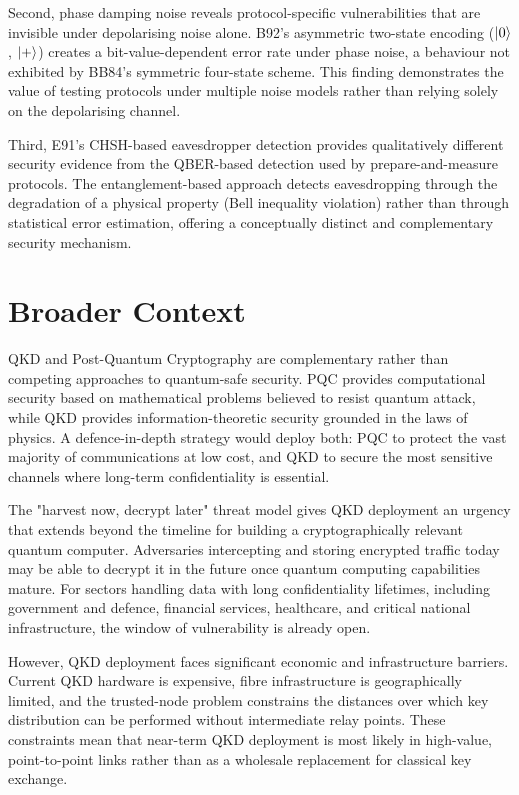 \documentclass[10pt, a4paper]{report}
\begin{document}
Second, phase damping noise reveals protocol-specific vulnerabilities that are invisible under depolarising noise alone. B92's asymmetric two-state encoding ($\ket{0}$, $\ket{+}$) creates a bit-value-dependent error rate under phase noise, a behaviour not exhibited by BB84's symmetric four-state scheme. This finding demonstrates the value of testing protocols under multiple noise models rather than relying solely on the depolarising channel.

Third, E91's CHSH-based eavesdropper detection provides qualitatively different security evidence from the QBER-based detection used by prepare-and-measure protocols. The entanglement-based approach detects eavesdropping through the degradation of a physical property (Bell inequality violation) rather than through statistical error estimation, offering a conceptually distinct and complementary security mechanism.



\section{Broader Context}

QKD and Post-Quantum Cryptography are complementary rather than competing approaches to quantum-safe security. PQC provides computational security based on mathematical problems believed to resist quantum attack, while QKD provides information-theoretic security grounded in the laws of physics. A defence-in-depth strategy would deploy both: PQC to protect the vast majority of communications at low cost, and QKD to secure the most sensitive channels where long-term confidentiality is essential.

The "harvest now, decrypt later" threat model gives QKD deployment an urgency that extends beyond the timeline for building a cryptographically relevant quantum computer. Adversaries intercepting and storing encrypted traffic today may be able to decrypt it in the future once quantum computing capabilities mature. For sectors handling data with long confidentiality lifetimes, including government and defence, financial services, healthcare, and critical national infrastructure, the window of vulnerability is already open.

However, QKD deployment faces significant economic and infrastructure barriers. Current QKD hardware is expensive, fibre infrastructure is geographically limited, and the trusted-node problem constrains the distances over which key distribution can be performed without intermediate relay points. These constraints mean that near-term QKD deployment is most likely in high-value, point-to-point links rather than as a wholesale replacement for classical key exchange.
\end{document}
